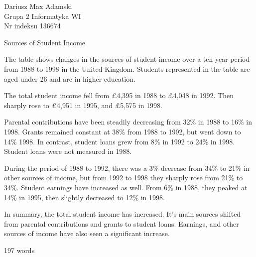\documentclass[12pt]{article}
\begin{document}

\begin{flushleft} 
	Dariusz Max Adamski \\
	Grupa 2 Informatyka WI\\
	Nr indeksu 136674
\end{flushleft}

\begin{center} 
	\vspace{0.8cm} \Large
	Sources of Student Income
	\vspace{0.5cm}
\end{center}

The table shows changes in the sources of student income over a ten-year period from 1988 to 1998 in the United Kingdom. Students represented in the table are aged under 26 and are in higher education.

The total student income fell from £4,395 in 1988 to £4,048 in 1992. Then sharply rose to £4,951 in 1995, and £5,575 in 1998.

Parental contributions have been steadily decreasing from 32\% in 1988 to 16\% in 1998. Grants remained constant at 38\% from 1988 to 1992, but went down to 14\% 1998. In contrast, student loans grew from 8\% in 1992 to 24\% in 1998. Student loans were not measured in 1988.

During the period of 1988 to 1992, there was a 3\% decrease from 34\% to 21\% in other sources of income, but from 1992 to 1998 they sharply rose from 21\% to 34\%. Student earnings have increased as well. From 6\% in 1988, they peaked at 14\% in 1995, then slightly decreased to 12\% in 1998.

In summary, the total student income has increased. It's main sources shifted from parental contributions and grants to student loans. Earnings, and other sources of income have also seen a significant increase.

197 words
\end{document}
